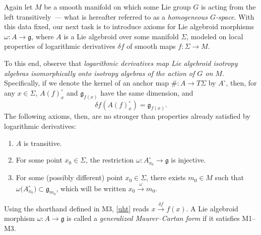 \documentclass[11pt]{article}
\numberwithin{equation}{section}
\numberwithin{equation}{section}
\begin{document}
Again let $M$ be a smooth manifold on which some Lie group $G$ is
acting from the left transitively~--- what is hereafter referred to as
a {\it homogeneous $G$-space}. With this data fixed, our next task is
to introduce axioms for Lie algebroid morphisms
$\omega \colon A \rightarrow {\mathfrak g}$, where $A$ is a Lie
algebroid over some manifold $\Sigma$, modeled on local properties of
logarithmic derivatives $\delta f$ of smooth maps
$f \colon \Sigma \rightarrow M$.

To this end, observe that {\it logarithmic derivatives map Lie
algebroid isotropy algebras isomorphically onto isotropy algebras of
the action of $G$ on $M$}. Specifically, if we denote the kernel of an
anchor map $\#\colon A \rightarrow T \Sigma$ by $A^\circ $, then, for
any $x \in \Sigma$, $A(f )_x^\circ$ and ${\mathfrak g}_{f(x)}$ have the
same dimension, and
\begin{equation}
\delta f(A(f)_x^\circ) = {\mathfrak g}_{f(x)}.
 \label{uht}
\end{equation}
The following axioms, then, are no stronger than
properties already satisfied by logarithmic derivatives:
\begin{enumerate}\itemsep=0pt
\item[M1] $A$ is transitive.
\item[M2] For some point $x_0 \in \Sigma $, the restriction
$\omega \colon A^\circ_{x_0} \rightarrow {\mathfrak g}$ is injective.
\item[M3] For some (possibly different) point $x_0 \in \Sigma $,
there exists $m_0 \in M$ such that $\omega\big(A^\circ_{x_0}\big) \subset
{\mathfrak g}_{m_0}$, which will be written $x_0\xrightarrow{\omega}m_0$.
\end{enumerate}
%
Using the shorthand defined in M3, \eqref{uht} reads $x
\xrightarrow{\delta f} f(x)$. A Lie algebroid morphism $\omega \colon
A \rightarrow {\mathfrak g}$ is called a {\it generalized
Maurer--Cartan form} if it satisfies M1--M3.
\end{document}
